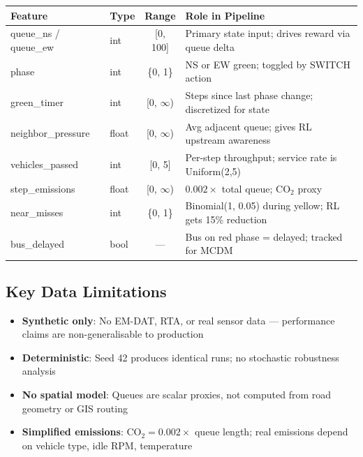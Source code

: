 \documentclass[11pt, a4paper]{article}
\begin{document}
\begin{table}[H]
\centering
\small
\begin{tabularx}{\textwidth}{l l c X}
    \toprule
    \textbf{Feature} & \textbf{Type} & \textbf{Range} & \textbf{Role in Pipeline} \\
    \midrule
    queue\_ns / queue\_ew & int & [0, 100] & Primary state input; drives reward via queue delta \\
    phase & int & \{0, 1\} & NS or EW green; toggled by SWITCH action \\
    green\_timer & int & [0, $\infty$) & Steps since last phase change; discretized for state \\
    neighbor\_pressure & float & [0, $\infty$) & Avg adjacent queue; gives RL upstream awareness \\
    vehicles\_passed & int & [0, 5] & Per-step throughput; service rate is Uniform(2,5) \\
    step\_emissions & float & [0, $\infty$) & $0.002 \times$ total queue; CO$_2$ proxy \\
    near\_misses & int & \{0, 1\} & Binomial(1, 0.05) during yellow; RL gets 15\% reduction \\
    bus\_delayed & bool & --- & Bus on red phase = delayed; tracked for MCDM \\
    \bottomrule
\end{tabularx}
\end{table}

\subsection{Key Data Limitations}

\begin{itemize}[nosep, leftmargin=*]
    \item \textbf{Synthetic only}: No EM-DAT, RTA, or real sensor data --- performance claims are non-generalisable to production
    \item \textbf{Deterministic}: Seed 42 produces identical runs; no stochastic robustness analysis
    \item \textbf{No spatial model}: Queues are scalar proxies, not computed from road geometry or GIS routing
    \item \textbf{Simplified emissions}: CO$_2 = 0.002 \times$ queue length; real emissions depend on vehicle type, idle RPM, temperature
\end{itemize}

\end{document}
